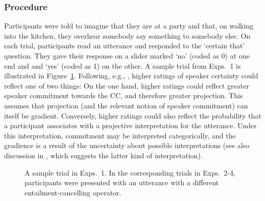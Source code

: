 \documentclass[a4paper,12pt,twoside]{article}
\begin{document}

		
        \subsubsection{Procedure}

			Participants were told to imagine that they are at a party and that, on walking into the kitchen, they overhear somebody say something to somebody else.
            On each trial, participants read an utterance and responded to the `certain that'   question. They gave their response on a slider marked `no' (coded as 0) at one end and and `yes' (coded as 1) on the other. A sample trial from Exps.~1 is illustrated in Figure~\ref{fig:trial}. Following, e.g., \citet{tonhauser_how_2018}, higher ratings of speaker certainty could reflect one of two things:
            On the one hand, higher ratings could reflect greater speaker commitment towards the CC, and therefore greater projection. This assumes that projection (and the relevant notion of speaker commitment) can itself be gradient.
            Conversely, higher ratings could also reflect the probability that a participant associates with a projective interpretation for the utterance. Under this interpretation, commitment may be interpreted categorically, and the gradience is a result of the uncertainty about possible interpretations (see also discussion in \citealt{grove_factivity_2023}, which suggests the latter kind of interpretation).


			\begin{figure}[ht]
				\centering
				\caption{A sample trial in Exps.~1. In the corresponding trials in Exps.~2-4, participants were presented with an utterance with a different entailment-cancelling operator.}
				\label{fig:trial}
			\end{figure}
   
\end{document}
